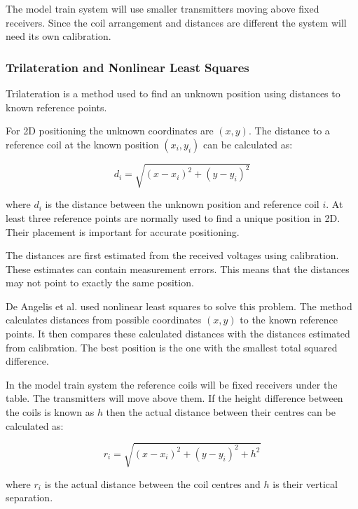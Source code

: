 The model train system will use smaller transmitters moving above fixed receivers. Since the coil arrangement and distances are different the system
will need its own calibration.





\subsubsection{Trilateration and Nonlinear Least Squares}
\label{sec:bg-1-5-1-2}

Trilateration is a method used to find an unknown position using distances to known reference points.

For 2D positioning the unknown coordinates are $(x,y)$. The distance to a reference coil at the
known position $(x_i,y_i)$ can be calculated as:

\begin{equation}
    d_i = \sqrt{(x-x_i)^2+(y-y_i)^2}
\end{equation}

where $d_i$ is the distance between the unknown position and reference coil $i$.
At least three reference points are normally used to find a unique position in 2D. Their placement
is important for accurate positioning.

The distances are first estimated from the received voltages using calibration. These estimates can
contain measurement errors. This means that the distances may not point to exactly the same position.

De Angelis et al. \cite{deangelis2015indoor} used nonlinear least squares to solve this problem.
The method calculates distances from possible coordinates $(x,y)$ to the known reference points.
It then compares these calculated distances with the distances estimated from calibration.
The best position is the one with the smallest total squared difference.

In the model train system the reference coils will be fixed receivers under the table.
The transmitters will move above them. If the height difference between the coils is known as $h$ then the actual distance between their centres 
can be calculated as:

\begin{equation}
    r_i = \sqrt{(x-x_i)^2+(y-y_i)^2+h^2}
\end{equation}

where $r_i$ is the actual distance between the coil centres and $h$ is their vertical separation.





